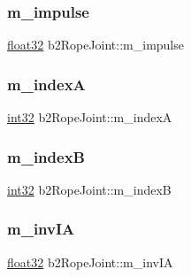 \subsubsection{\texorpdfstring{m\_impulse}{m\_impulse}}
{\footnotesize\ttfamily \mbox{\hyperlink{b2_settings_8h_aacdc525d6f7bddb3ae95d5c311bd06a1}{float32}} b2\+Rope\+Joint\+::m\+\_\+impulse\hspace{0.3cm}{\ttfamily [protected]}}

\mbox{\label{classb2_rope_joint_a34875f5852d011dab695613a23adca08}} 
\subsubsection{\texorpdfstring{m\_indexA}{m\_indexA}}
{\footnotesize\ttfamily \mbox{\hyperlink{b2_settings_8h_a43d43196463bde49cb067f5c20ab8481}{int32}} b2\+Rope\+Joint\+::m\+\_\+indexA\hspace{0.3cm}{\ttfamily [protected]}}

\mbox{\label{classb2_rope_joint_aa67100c069a1a273314dfa55c9063fc7}} 
\subsubsection{\texorpdfstring{m\_indexB}{m\_indexB}}
{\footnotesize\ttfamily \mbox{\hyperlink{b2_settings_8h_a43d43196463bde49cb067f5c20ab8481}{int32}} b2\+Rope\+Joint\+::m\+\_\+indexB\hspace{0.3cm}{\ttfamily [protected]}}

\mbox{\label{classb2_rope_joint_a1917a65b89668c433d06071970a6875a}} 
\subsubsection{\texorpdfstring{m\_invIA}{m\_invIA}}
{\footnotesize\ttfamily \mbox{\hyperlink{b2_settings_8h_aacdc525d6f7bddb3ae95d5c311bd06a1}{float32}} b2\+Rope\+Joint\+::m\+\_\+inv\+IA\hspace{0.3cm}{\ttfamily [protected]}}

